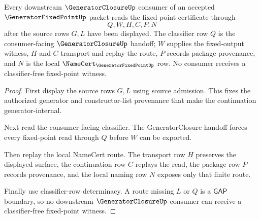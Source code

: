 \begin{theorem}
\label{thm:generator-fixed-point-closure-consumer-namecert-handoff}
Every downstream $\GeneratorClosureUp$ consumer of an accepted $\GeneratorFixedPointUp$ packet reads the fixed-point certificate through
$$
Q,W,H,C,P,N
$$
after the source rows $G,L$ have been displayed. The classifier row $Q$ is the consumer-facing $\GeneratorClosureUp$ handoff; $W$ supplies the fixed-output witness, $H$ and $C$ transport and replay the route, $P$ records package provenance, and $N$ is the local $\NameCert_{\GeneratorFixedPointUp}$ row. No consumer receives a classifier-free fixed-point witness.
\end{theorem}
\begin{proof}
First display the source rows $G,L$ using source admission. This fixes the authorized generator and constructor-list provenance that make the continuation generator-internal.

Next read the consumer-facing classifier. The GeneratorClosure handoff forces every fixed-point read through $Q$ before $W$ can be exported.

Then replay the local NameCert route. The transport row $H$ preserves the displayed surface, the continuation row $C$ replays the read, the package row $P$ records provenance, and the local naming row $N$ exposes only that finite route.

Finally use classifier-row determinacy. A route missing $L$ or $Q$ is a $\mathsf{GAP}$ boundary, so no downstream $\GeneratorClosureUp$ consumer can receive a classifier-free fixed-point witness.
\end{proof}

